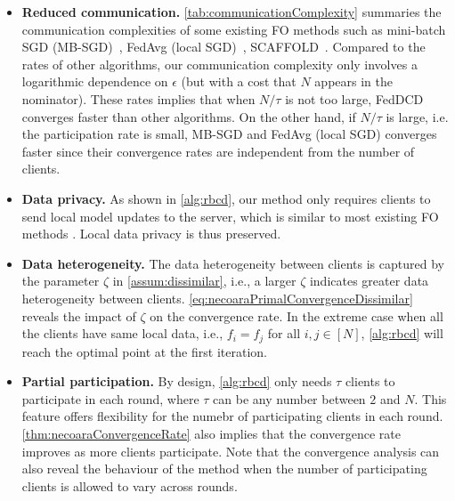 \begin{itemize}
    \item \textbf{Reduced communication.} 
    \autoref{tab:communicationComplexity} summaries the communication complexities of some existing FO methods such as mini-batch SGD (MB-SGD)~\citep{WoodworthPS20}, FedAvg (local SGD)~\citep{mcmahan2017communication}, SCAFFOLD~\citep{pmlr-v119-karimireddy20a}. Compared to the rates of other algorithms, our communication complexity only involves a logarithmic dependence on $\epsilon$ (but with a cost that $N$ appears in the nominator). These rates implies that when $N/\tau$ is not too large, FedDCD converges faster than other algorithms.
    On the other hand, if $N/\tau$ is large, i.e. the participation rate is small, MB-SGD and FedAvg (local SGD) converges faster since their convergence rates are independent from the number of clients. 
    \item \textbf{Data privacy.} As shown in \autoref{alg:rbcd}, our method only requires clients to send local model updates to the server, which is similar to most existing FO methods \citep{mcmahan2017communication,li2018federated,yuan2021federated,karimireddy2020mime}. Local data privacy is thus preserved. 
    \item \textbf{Data heterogeneity.} 
    The data heterogeneity between clients is captured by the parameter $\zeta$ in \autoref{assum:dissimilar}, i.e., a larger $\zeta$ indicates greater data heterogeneity between clients. \autoref{eq:necoaraPrimalConvergenceDissimilar} reveals the impact of $\zeta$ on the convergence rate. In the extreme case when all the clients have same local data, i.e., $f_i = f_j$ for all $i,j \in [N]$, \autoref{alg:rbcd} will reach the optimal point at the first iteration.
    \item \textbf{Partial participation.} By design, \autoref{alg:rbcd} only needs $\tau$ clients to participate in each round, where $\tau$ can be any number between $2$ and $N$. This feature offers flexibility for the numebr of participating clients in each round. \autoref{thm:necoaraConvergenceRate} also implies that the convergence rate improves as more clients participate. Note that the convergence analysis can also reveal the behaviour of the method when the number of participating clients is allowed to vary across rounds.
\end{itemize}

